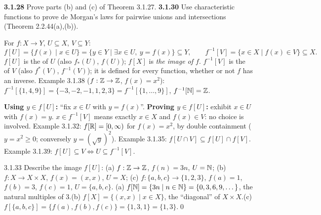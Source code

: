 \begin{trybox}[{3.1.28, 3.1.30 \fO}]
\textbf{3.1.28} Prove parts (b) and (c) of Theorem 3.1.27. \quad \textbf{3.1.30} Use characteristic functions to prove de Morgan's laws for pairwise unions and intersections (Theorem 2.2.44(a),(b)).
\end{trybox}

\begin{key}
For $f:X\to Y$, $U\subseteq X$, $V\subseteq Y$:
\[
f[U]=\{f(x)\mid x\in U\}=\{y\in Y\mid\exists x\in U,\ y=f(x)\}\subseteq Y,\qquad
f^{-1}[V]=\{x\in X\mid f(x)\in V\}\subseteq X.
\]
$f[U]$ is the  of $U$ (also $f_*(U)$, $f(U)$); $f[X]$ is \emph{the image of $f$}. $f^{-1}[V]$ is the  of $V$ (also $f^*(V)$, $f^{-1}(V)$); it is defined for every function, whether or not $f$ has an inverse. Example 3.1.38 ($f:\mathbb{Z}\to\mathbb{Z}$, $f(x)=x^2$): $f^{-1}[\{1,4,9\}]=\{-3,-2,-1,1,2,3\}=f^{-1}[\{1,\dots,9\}]$, $f^{-1}[\mathbb{N}]=\mathbb{Z}$.
\end{key}
\begin{strategy}
\textbf{Using $y\in f[U]$:} ``fix $x\in U$ with $y=f(x)$''. \textbf{Proving $y\in f[U]$:} exhibit $x\in U$ with $f(x)=y$. \textbf{$x\in f^{-1}[V]$} means exactly $x\in X$ and $f(x)\in V$: no choice is involved. Example 3.1.32: $f[\mathbb{R}]=[0,\infty)$ for $f(x)=x^2$, by double containment ($y=x^2\ge0$; conversely $y=(\sqrt y)^2$). Example 3.1.35: $f[U\cap V]\subseteq f[U]\cap f[V]$. Example 3.1.39: $f[U]\subseteq V\Leftrightarrow U\subseteq f^{-1}[V]$.
\end{strategy}

\begin{bookex}[recommended]{3.1.33}
Describe the image $f[U]$: (a) $f:\mathbb{Z}\to\mathbb{Z}$, $f(n)=3n$, $U=\mathbb{N}$; (b) $f:X\to X\times X$, $f(x)=(x,x)$, $U=X$; (c) $f:\{a,b,c\}\to\{1,2,3\}$, $f(a)=1$, $f(b)=3$, $f(c)=1$, $U=\{a,b,c\}$.
\solution
(a) $f[\mathbb{N}]=\{3n\mid n\in\mathbb{N}\}=\{0,3,6,9,\dots\}$, the natural multiples of $3$.\quad (b) $f[X]=\{(x,x)\mid x\in X\}$, the ``diagonal'' of $X\times X$.\quad (c) $f[\{a,b,c\}]=\{f(a),f(b),f(c)\}=\{1,3,1\}=\{1,3\}$.\qed
\end{bookex}

